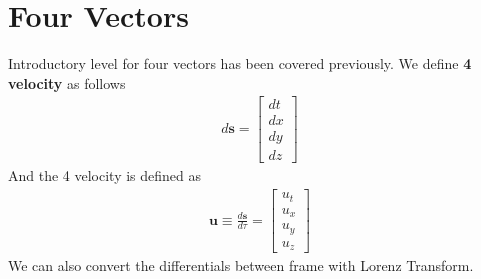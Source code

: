 \documentclass[11pt,letterpaper]{book}
\begin{document}
\section{Four Vectors}
Introductory level for four vectors has been covered previously. We define \textbf{4 velocity} as follows
\begin{align}
d\mathbf{s} = \begin{bmatrix}
    dt\\dx\\dy\\dz
\end{bmatrix}
\end{align}
And the 4 velocity is defined as
\begin{align}
\mathbf{u}\equiv \frac{d\mathbf{s}}{d\tau}=
\begin{bmatrix}
    u_t\\u_x\\u_y\\u_z
\end{bmatrix}
\end{align}
We can also convert the differentials between frame with Lorenz Transform.
\end{document}

